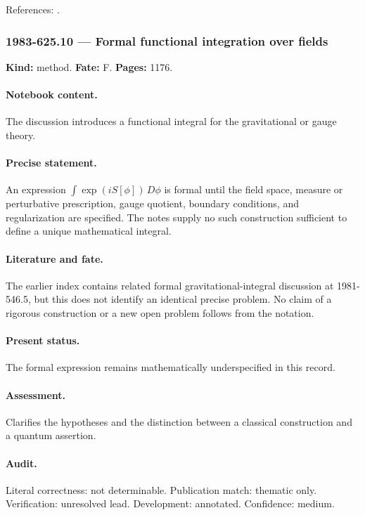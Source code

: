 \noindent References: \citep{vannieuwenhuizen1981supergravity}.\par

\subsubsection{1983-625.10 --- Formal functional integration over fields}

\label{item:1983-625.10}

\noindent\textbf{Kind:} method. \textbf{Fate:} F. \textbf{Pages:} 1176.\par

\paragraph{Notebook content.} The discussion introduces a functional integral for the gravitational or gauge theory.

\paragraph{Precise statement.} An expression \(\int \exp(iS[\phi])\,D\phi\) is formal until the field space, measure or perturbative prescription, gauge quotient, boundary conditions, and regularization are specified. The notes supply no such construction sufficient to define a unique mathematical integral.

\paragraph{Literature and fate.} The earlier index contains related formal gravitational-integral discussion at 1981-546.5, but this does not identify an identical precise problem. No claim of a rigorous construction or a new open problem follows from the notation.

\paragraph{Present status.} The formal expression remains mathematically underspecified in this record.

\paragraph{Assessment.} Clarifies the hypotheses and the distinction between a classical construction and a quantum assertion.

\paragraph{Audit.} Literal correctness: not determinable. Publication match: thematic only. Verification: unresolved lead. Development: annotated. Confidence: medium.

